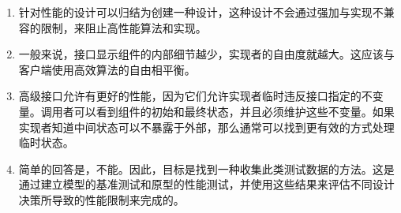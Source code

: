 \begin{enumerate}
\item 
针对性能的设计可以归结为创建一种设计，这种设计不会通过强加与实现不兼容的限制，来阻止高性能算法和实现。

\item 
一般来说，接口显示组件的内部细节越少，实现者的自由度就越大。这应该与客户端使用高效算法的自由相平衡。

\item 
高级接口允许有更好的性能，因为它们允许实现者临时违反接口指定的不变量。调用者可以看到组件的初始和最终状态，并且必须维护这些不变量。如果实现者知道中间状态可以不暴露于外部，那么通常可以找到更有效的方式处理临时状态。

\item
简单的回答是，不能。因此，目标是找到一种收集此类测试数据的方法。这是通过建立模型的基准测试和原型的性能测试，并使用这些结果来评估不同设计决策所导致的性能限制来完成的。

\end{enumerate}